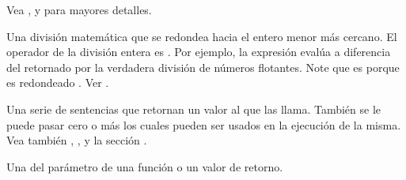 \documentclass[a4,10pt,spanish]{sphinxmanual}
\begin{document}
\begin{description}
\sphinxAtStartPar
Vea ,  y  para mayores detalles.

\item[{división entera\index{división entera@\spxentry{división entera}|spxpagem}\phantomsection\label{\detokenize{glossary:term-floor-division}}}] \leavevmode
\sphinxAtStartPar
Una división matemática que se redondea hacia el entero menor más cercano.  El operador de la división entera es \sphinxcode{\sphinxupquote{//}}.  Por ejemplo, la expresión  evalúa  a diferencia del  retornado por la verdadera división de números flotantes.  Note que  es  porque es  redondeado . Ver .

\item[{función\index{función@\spxentry{función}|spxpagem}\phantomsection\label{\detokenize{glossary:term-function}}}] \leavevmode
\sphinxAtStartPar
Una serie de sentencias que retornan un valor al que las llama.  También se le puede pasar cero o más {\hyperref[\detokenize{glossary:term-argument}]{}} los cuales pueden ser usados en la ejecución de la misma. Vea también {\hyperref[\detokenize{glossary:term-parameter}]{}}, {\hyperref[\detokenize{glossary:term-method}]{}}, y la sección .

\item[{anotación de función\index{anotación de función@\spxentry{anotación de función}|spxpagem}\phantomsection\label{\detokenize{glossary:term-function-annotation}}}] \leavevmode
\sphinxAtStartPar
Una {\hyperref[\detokenize{glossary:term-annotation}]{}} del parámetro de una función o un valor de retorno.


\end{description}
\end{document}
